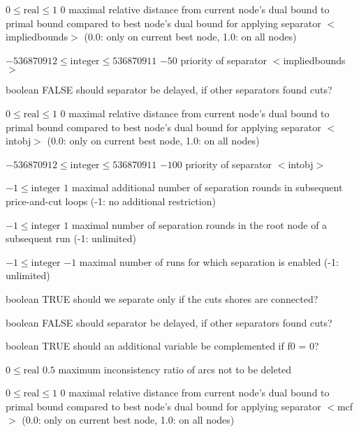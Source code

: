 %
{$0\leq\textrm{real}\leq1$}%
{$0$}%
{maximal relative distance from current node's dual bound to primal bound compared to best node's dual bound for applying separator $<$impliedbounds$>$ (0.0: only on current best node, 1.0: on all nodes)}%
{}

%
{$-536870912\leq\textrm{integer}\leq536870911$}%
{$-50$}%
{priority of separator $<$impliedbounds$>$}%
{}

%
{boolean}%
{FALSE}%
{should separator be delayed, if other separators found cuts?}%
{}

%
{$0\leq\textrm{real}\leq1$}%
{$0$}%
{maximal relative distance from current node's dual bound to primal bound compared to best node's dual bound for applying separator $<$intobj$>$ (0.0: only on current best node, 1.0: on all nodes)}%
{}

%
{$-536870912\leq\textrm{integer}\leq536870911$}%
{$-100$}%
{priority of separator $<$intobj$>$}%
{}

%
{$-1\leq\textrm{integer}$}%
{$1$}%
{maximal additional number of separation rounds in subsequent price-and-cut loops (-1: no additional restriction)}%
{}

%
{$-1\leq\textrm{integer}$}%
{$1$}%
{maximal number of separation rounds in the root node of a subsequent run (-1: unlimited)}%
{}

%
{$-1\leq\textrm{integer}$}%
{$-1$}%
{maximal number of runs for which separation is enabled (-1: unlimited)}%
{}

%
{boolean}%
{TRUE}%
{should we separate only if the cuts shores are connected?}%
{}

%
{boolean}%
{FALSE}%
{should separator be delayed, if other separators found cuts?}%
{}

%
{boolean}%
{TRUE}%
{should an additional variable be complemented if f0 = 0?}%
{}

%
{$0\leq\textrm{real}$}%
{$0.5$}%
{maximum inconsistency ratio of arcs not to be deleted}%
{}

%
{$0\leq\textrm{real}\leq1$}%
{$0$}%
{maximal relative distance from current node's dual bound to primal bound compared to best node's dual bound for applying separator $<$mcf$>$ (0.0: only on current best node, 1.0: on all nodes)}%
{}

